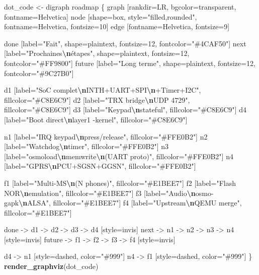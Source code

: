 \documentclass[
]{article}
\newenvironment{Shaded}{\begin{snugshade}}{\end{snugshade}}
\newcommand{\FunctionTok}[1]{\textcolor[rgb]{0.13,0.29,0.53}{\textbf{#1}}}
\newcommand{\NormalTok}[1]{#1}
\newcommand{\OtherTok}[1]{\textcolor[rgb]{0.56,0.35,0.01}{#1}}
\newcommand{\SpecialCharTok}[1]{\textcolor[rgb]{0.81,0.36,0.00}{\textbf{#1}}}
\newcommand{\StringTok}[1]{\textcolor[rgb]{0.31,0.60,0.02}{#1}}
\begin{document}
\begin{Shaded}
\begin{Highlighting}[]
\NormalTok{dot\_code }\OtherTok{\textless{}{-}} \StringTok{\textquotesingle{}digraph roadmap \{}
\StringTok{  graph [rankdir=LR, bgcolor=transparent, fontname=Helvetica]}
\StringTok{  node [shape=box, style="filled,rounded", fontname=Helvetica, fontsize=10]}
\StringTok{  edge [fontname=Helvetica, fontsize=9]}

\StringTok{  done [label="Fait", shape=plaintext, fontsize=12, fontcolor="\#4CAF50"]}
\StringTok{  next [label="Prochaines}\SpecialCharTok{\textbackslash{}n}\StringTok{étapes", shape=plaintext, fontsize=12, fontcolor="\#FF9800"]}
\StringTok{  future [label="Long terme", shape=plaintext, fontsize=12, fontcolor="\#9C27B0"]}

\StringTok{  d1 [label="SoC complet}\SpecialCharTok{\textbackslash{}n}\StringTok{INTH+UART+SPI}\SpecialCharTok{\textbackslash{}n}\StringTok{+Timer+I2C", fillcolor="\#C8E6C9"]}
\StringTok{  d2 [label="TRX bridge}\SpecialCharTok{\textbackslash{}n}\StringTok{UDP 4729", fillcolor="\#C8E6C9"]}
\StringTok{  d3 [label="Keypad}\SpecialCharTok{\textbackslash{}n}\StringTok{stateful", fillcolor="\#C8E6C9"]}
\StringTok{  d4 [label="Boot direct}\SpecialCharTok{\textbackslash{}n}\StringTok{layer1 {-}kernel", fillcolor="\#C8E6C9"]}

\StringTok{  n1 [label="IRQ keypad}\SpecialCharTok{\textbackslash{}n}\StringTok{press/release", fillcolor="\#FFE0B2"]}
\StringTok{  n2 [label="Watchdog}\SpecialCharTok{\textbackslash{}n}\StringTok{timer", fillcolor="\#FFE0B2"]}
\StringTok{  n3 [label="osmoload}\SpecialCharTok{\textbackslash{}n}\StringTok{memwrite}\SpecialCharTok{\textbackslash{}n}\StringTok{(UART proto)", fillcolor="\#FFE0B2"]}
\StringTok{  n4 [label="GPRS}\SpecialCharTok{\textbackslash{}n}\StringTok{PCU+SGSN+GGSN", fillcolor="\#FFE0B2"]}

\StringTok{  f1 [label="Multi{-}MS}\SpecialCharTok{\textbackslash{}n}\StringTok{(N phones)", fillcolor="\#E1BEE7"]}
\StringTok{  f2 [label="Flash NOR}\SpecialCharTok{\textbackslash{}n}\StringTok{emulation", fillcolor="\#E1BEE7"]}
\StringTok{  f3 [label="Audio}\SpecialCharTok{\textbackslash{}n}\StringTok{osmo{-}gapk}\SpecialCharTok{\textbackslash{}n}\StringTok{ALSA", fillcolor="\#E1BEE7"]}
\StringTok{  f4 [label="Upstream}\SpecialCharTok{\textbackslash{}n}\StringTok{QEMU merge", fillcolor="\#E1BEE7"]}

\StringTok{  done {-}\textgreater{} d1 {-}\textgreater{} d2 {-}\textgreater{} d3 {-}\textgreater{} d4 [style=invis]}
\StringTok{  next {-}\textgreater{} n1 {-}\textgreater{} n2 {-}\textgreater{} n3 {-}\textgreater{} n4 [style=invis]}
\StringTok{  future {-}\textgreater{} f1 {-}\textgreater{} f2 {-}\textgreater{} f3 {-}\textgreater{} f4 [style=invis]}

\StringTok{  d4 {-}\textgreater{} n1 [style=dashed, color="\#999"]}
\StringTok{  n4 {-}\textgreater{} f1 [style=dashed, color="\#999"]}
\StringTok{\}\textquotesingle{}}
\FunctionTok{render\_graphviz}\NormalTok{(dot\_code)}
\end{Highlighting}
\end{Shaded}
\end{document}
